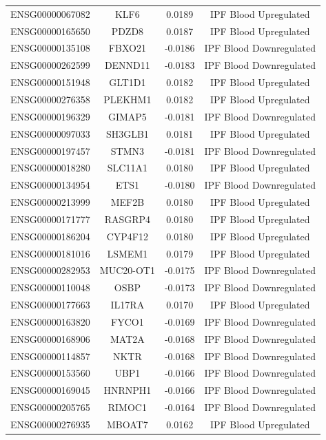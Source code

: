 \documentclass[
]{article}
\begin{document}
\begin{singlespace}
\begin{longtable}[t]{lccc}
ENSG00000067082 & KLF6 & 0.0189 & IPF Blood Upregulated\\
\addlinespace
ENSG00000165650 & PDZD8 & 0.0187 & IPF Blood Upregulated\\
ENSG00000135108 & FBXO21 & -0.0186 & IPF Blood Downregulated\\
ENSG00000262599 & DENND11 & -0.0183 & IPF Blood Downregulated\\
ENSG00000151948 & GLT1D1 & 0.0182 & IPF Blood Upregulated\\
ENSG00000276358 & PLEKHM1 & 0.0182 & IPF Blood Upregulated\\
\addlinespace
ENSG00000196329 & GIMAP5 & -0.0181 & IPF Blood Downregulated\\
ENSG00000097033 & SH3GLB1 & 0.0181 & IPF Blood Upregulated\\
ENSG00000197457 & STMN3 & -0.0181 & IPF Blood Downregulated\\
ENSG00000018280 & SLC11A1 & 0.0180 & IPF Blood Upregulated\\
ENSG00000134954 & ETS1 & -0.0180 & IPF Blood Downregulated\\
\addlinespace
ENSG00000213999 & MEF2B & 0.0180 & IPF Blood Upregulated\\
ENSG00000171777 & RASGRP4 & 0.0180 & IPF Blood Upregulated\\
ENSG00000186204 & CYP4F12 & 0.0180 & IPF Blood Upregulated\\
ENSG00000181016 & LSMEM1 & 0.0179 & IPF Blood Upregulated\\
ENSG00000282953 & MUC20-OT1 & -0.0175 & IPF Blood Downregulated\\
\addlinespace
ENSG00000110048 & OSBP & -0.0173 & IPF Blood Downregulated\\
ENSG00000177663 & IL17RA & 0.0170 & IPF Blood Upregulated\\
ENSG00000163820 & FYCO1 & -0.0169 & IPF Blood Downregulated\\
ENSG00000168906 & MAT2A & -0.0168 & IPF Blood Downregulated\\
ENSG00000114857 & NKTR & -0.0168 & IPF Blood Downregulated\\
\addlinespace
ENSG00000153560 & UBP1 & -0.0166 & IPF Blood Downregulated\\
ENSG00000169045 & HNRNPH1 & -0.0166 & IPF Blood Downregulated\\
ENSG00000205765 & RIMOC1 & -0.0164 & IPF Blood Downregulated\\
ENSG00000276935 & MBOAT7 & 0.0162 & IPF Blood Upregulated\\

\end{longtable}
\end{singlespace}
\end{document}
